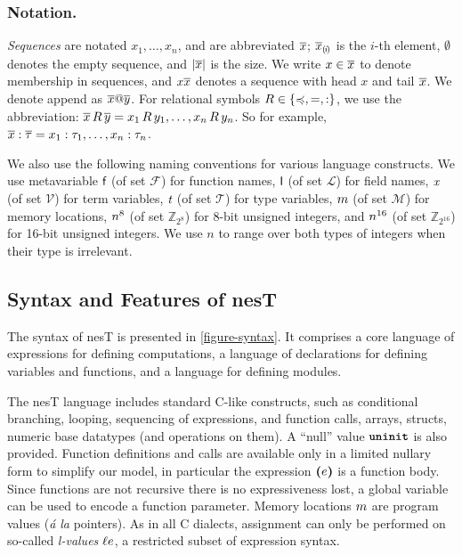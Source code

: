 \subsubsection{Notation.}  \emph{Sequences} are notated
$x_1,\ldots,x_n$, and are abbreviated $\overline{x}$; $\overline{x}_{(\mskip -2.5mu i\mskip -2.5mu)}$ is the $i$-th
element, $\emptyset$ denotes the empty sequence, and $|\overline{x}|$
is the size. We write $x \in \overline{x}$ to denote membership in
sequences, and $x\overline{x}$ denotes a sequence with head $x$ and tail
$\overline{x}$.  We denote append as $\overline{x}@\overline{y}$.  For relational
symbols $R \in \{ \preccurlyeq, =, : \}$, we use the abbreviation:
$\overline{x}\, R\, \overline{y} = x_1\, R\, y_1, \ldots, x_n\, R\, y_n$. So
for example, $\overline{x} : \overline{\tau} = x_1 : \tau_1,\ldots,x_n : \tau_n$.

We also use the following naming conventions for various language 
constructs.
We use metavariable $\textsf{f}$ (of set $\mathcal{F}$) for function
names, $\textsf{l}$ (of set $\mathcal{L}$) for field names, $\textit{x}$ (of
set $\mathcal{V}$) for term variables, $\textit{t}$ (of set $\mathcal{T}$)
for type variables, $ m$ (of set $\mathcal{M}$) for memory
locations, $n^{8}$ (of set $\mathbb{Z}_{2^8}$) for 8-bit unsigned
integers, and $n^{16}$ (of set $\mathbb{Z}_{2^{16}}$) for 16-bit
unsigned integers.  We use $n$ to range over both types of integers
when their type is irrelevant.
\subsection{Syntax and Features of nesT} The syntax of nesT is presented 
in \autoref{figure-syntax}. It comprises a core language of
expressions for defining computations, a language of declarations for
defining variables and functions, and a language for defining modules.

\semanticssyntaxfig

\coresemanticsfig

The nesT language includes standard C-like 
constructs, such as conditional branching, looping, sequencing of
expressions, and function calls, arrays, structs, numeric base
datatypes (and operations on them). %
A ``null'' value $\mbox{\bf \texttt{uninit}}$ is also provided.  Function definitions and
calls are available only in a limited nullary form to simplify our
model, in particular the expression $\textbf{(}e\textbf{)}$ is a function body.
Since functions are not recursive there is no expressiveness lost, a
global variable can be used to encode a function
parameter.  Memory locations $m$ are program values (\emph{\'a la}
pointers).  As in all C dialects, assignment can only be performed on
so-called \emph{l-values} $\ell e$, a restricted subset of expression syntax.

